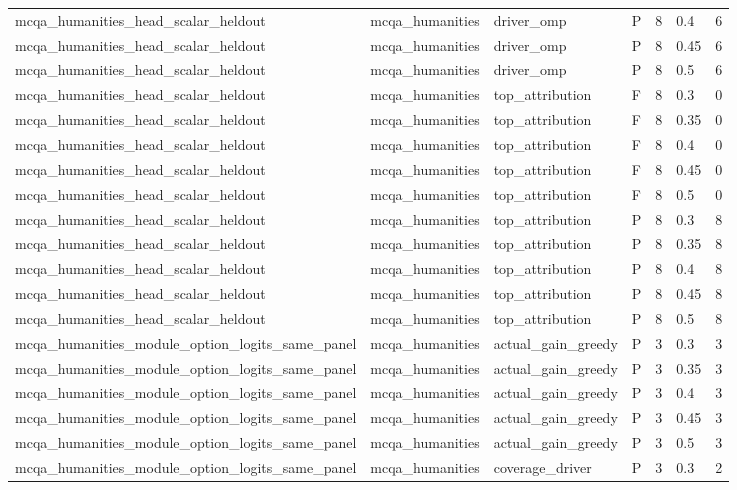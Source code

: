 \begin{tabular}{lllllll}
mcqa\_humanities\_head\_scalar\_heldout & mcqa\_humanities & driver\_omp & P & 8 & 0.4 & 6 \\
mcqa\_humanities\_head\_scalar\_heldout & mcqa\_humanities & driver\_omp & P & 8 & 0.45 & 6 \\
mcqa\_humanities\_head\_scalar\_heldout & mcqa\_humanities & driver\_omp & P & 8 & 0.5 & 6 \\
mcqa\_humanities\_head\_scalar\_heldout & mcqa\_humanities & top\_attribution & F & 8 & 0.3 & 0 \\
mcqa\_humanities\_head\_scalar\_heldout & mcqa\_humanities & top\_attribution & F & 8 & 0.35 & 0 \\
mcqa\_humanities\_head\_scalar\_heldout & mcqa\_humanities & top\_attribution & F & 8 & 0.4 & 0 \\
mcqa\_humanities\_head\_scalar\_heldout & mcqa\_humanities & top\_attribution & F & 8 & 0.45 & 0 \\
mcqa\_humanities\_head\_scalar\_heldout & mcqa\_humanities & top\_attribution & F & 8 & 0.5 & 0 \\
mcqa\_humanities\_head\_scalar\_heldout & mcqa\_humanities & top\_attribution & P & 8 & 0.3 & 8 \\
mcqa\_humanities\_head\_scalar\_heldout & mcqa\_humanities & top\_attribution & P & 8 & 0.35 & 8 \\
mcqa\_humanities\_head\_scalar\_heldout & mcqa\_humanities & top\_attribution & P & 8 & 0.4 & 8 \\
mcqa\_humanities\_head\_scalar\_heldout & mcqa\_humanities & top\_attribution & P & 8 & 0.45 & 8 \\
mcqa\_humanities\_head\_scalar\_heldout & mcqa\_humanities & top\_attribution & P & 8 & 0.5 & 8 \\
mcqa\_humanities\_module\_option\_logits\_same\_panel & mcqa\_humanities & actual\_gain\_greedy & P & 3 & 0.3 & 3 \\
mcqa\_humanities\_module\_option\_logits\_same\_panel & mcqa\_humanities & actual\_gain\_greedy & P & 3 & 0.35 & 3 \\
mcqa\_humanities\_module\_option\_logits\_same\_panel & mcqa\_humanities & actual\_gain\_greedy & P & 3 & 0.4 & 3 \\
mcqa\_humanities\_module\_option\_logits\_same\_panel & mcqa\_humanities & actual\_gain\_greedy & P & 3 & 0.45 & 3 \\
mcqa\_humanities\_module\_option\_logits\_same\_panel & mcqa\_humanities & actual\_gain\_greedy & P & 3 & 0.5 & 3 \\
mcqa\_humanities\_module\_option\_logits\_same\_panel & mcqa\_humanities & coverage\_driver & P & 3 & 0.3 & 2 \\

\end{tabular}
